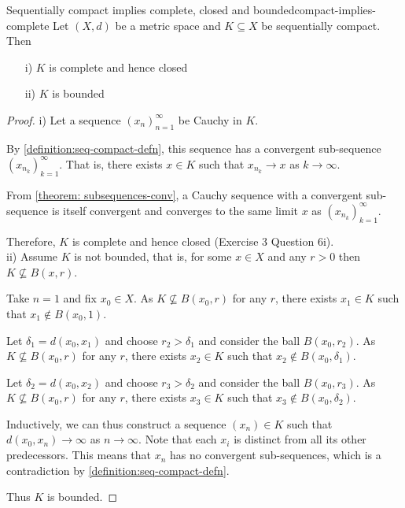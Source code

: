 \documentclass{article}
\numberwithin{equation}{section}
\numberwithin{figure}{section}
\begin{document}
\begin{theorem}{Sequentially compact implies complete, closed and bounded}{compact-implies-complete}
    Let $(X,d)$ be a metric space and $K \subseteq X$ be sequentially compact. Then 
    \begin{itemize}
        \item[i)] $K$ is complete and hence closed
        \item[ii)] $K$ is bounded 
    \end{itemize}
    \begin{proof}
        i) Let a sequence $(x_n)^\infty_{n=1}$ be Cauchy in $K$.

            By \cref{definition:seq-compact-defn}, this sequence has a convergent sub-sequence $(x_{n_k})^\infty_{k=1}$. That is, there exists $x \in K$ such that $x_{n_k} \to x$ as $k \to \infty$.

            From \cref{theorem: subsequences-conv}, a Cauchy sequence with a convergent sub-sequence is itself convergent and converges to the same limit $x$ as $(x_{n_k})^\infty_{k=1}$.

            Therefore, $K$ is complete and hence closed (Exercise 3 Question 6i).
            \\
            
            ii) Assume $K$ is not bounded, that is, for some $x \in X$ and any $r > 0$ then $K \not\subseteq B(x,r)$.

            Take $n=1$ and fix $x_0 \in X$. As $K \not\subseteq B(x_0,r)$ for any $r$, there exists $x_1 \in K$ such that $x_1 \not\in B(x_0, 1)$.

            Let $\delta_1 = d(x_0,x_1)$ and choose $r_2>\delta_1$ and consider the ball $B(x_0,r_2)$. As $K \not\subseteq B(x_0,r)$ for any $r$, there exists $x_2 \in K$ such that $x_2 \not\in B(x_0, \delta_1)$.

            Let $\delta_2 = d(x_0,x_2)$ and choose $r_3>\delta_2$ and consider the ball $B(x_0,r_3)$. As $K \not\subseteq B(x_0,r)$ for any $r$, there exists $x_3 \in K$ such that $x_3 \not\in B(x_0, \delta_2)$.

            Inductively, we can thus construct a sequence $(x_n)\in K$ such that $d(x_0, x_n) \to \infty$ as $n\to \infty$. Note that each $x_i$ is distinct from all its other predecessors. This means that $x_n$ has no convergent sub-sequences, which is a contradiction by \cref{definition:seq-compact-defn}.

            Thus $K$ is bounded.
    \end{proof}
\end{theorem}
\end{document}

